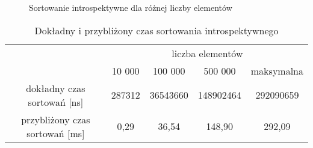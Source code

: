 \begin{figure}[H]
{
    }
    \caption{Sortowanie introspektywne dla różnej liczby elementów}
    \label{fig: introspektywne}
\end{figure}

\begin{table}[H]
    \caption{Dokładny i przybliżony czas sortowania introspektywnego}
    \label{tab: czas_introspektywne}
    \begin{tabular}{c|cccc|}
    \cline{2-5}
                                                             & \multicolumn{4}{c|}{liczba elementów}                                                                     \\ \cline{2-5} 
                                                             & \multicolumn{1}{c|}{10 000} & \multicolumn{1}{c|}{100 000}  & \multicolumn{1}{c|}{500 000}   & maksymalna \\ \hline
    \multicolumn{1}{|c|}{dokładny czas sortowań {[}ns{]}}    & \multicolumn{1}{c|}{287312} & \multicolumn{1}{c|}{36543660} & \multicolumn{1}{c|}{148902464} & 292090659  \\ \hline
    \multicolumn{1}{|c|}{przybliżony czas sortowań {[}ms{]}} & \multicolumn{1}{c|}{0,29}   & \multicolumn{1}{c|}{36,54}    & \multicolumn{1}{c|}{148,90}    & 292,09     \\ \hline
    \end{tabular}
    \end{table}